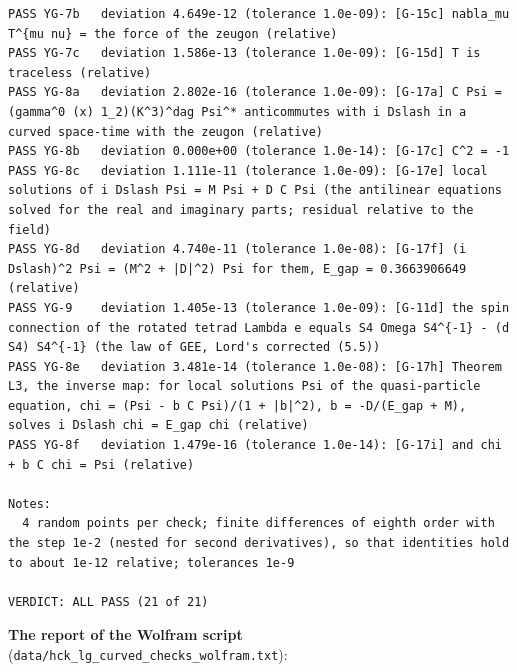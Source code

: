 \documentclass[
  10pt,
]{article}
\begin{document}
\begin{verbatim}
PASS YG-7b   deviation 4.649e-12 (tolerance 1.0e-09): [G-15c] nabla_mu T^{mu nu} = the force of the zeugon (relative)
PASS YG-7c   deviation 1.586e-13 (tolerance 1.0e-09): [G-15d] T is traceless (relative)
PASS YG-8a   deviation 2.802e-16 (tolerance 1.0e-09): [G-17a] C Psi = (gamma^0 (x) 1_2)(K^3)^dag Psi^* anticommutes with i Dslash in a curved space-time with the zeugon (relative)
PASS YG-8b   deviation 0.000e+00 (tolerance 1.0e-14): [G-17c] C^2 = -1
PASS YG-8c   deviation 1.111e-11 (tolerance 1.0e-09): [G-17e] local solutions of i Dslash Psi = M Psi + D C Psi (the antilinear equations solved for the real and imaginary parts; residual relative to the field)
PASS YG-8d   deviation 4.740e-11 (tolerance 1.0e-08): [G-17f] (i Dslash)^2 Psi = (M^2 + |D|^2) Psi for them, E_gap = 0.3663906649 (relative)
PASS YG-9    deviation 1.405e-13 (tolerance 1.0e-09): [G-11d] the spin connection of the rotated tetrad Lambda e equals S4 Omega S4^{-1} - (d S4) S4^{-1} (the law of GEE, Lord's corrected (5.5))
PASS YG-8e   deviation 3.481e-14 (tolerance 1.0e-08): [G-17h] Theorem L3, the inverse map: for local solutions Psi of the quasi-particle equation, chi = (Psi - b C Psi)/(1 + |b|^2), b = -D/(E_gap + M), solves i Dslash chi = E_gap chi (relative)
PASS YG-8f   deviation 1.479e-16 (tolerance 1.0e-14): [G-17i] and chi + b C chi = Psi (relative)

Notes:
  4 random points per check; finite differences of eighth order with the step 1e-2 (nested for second derivatives), so that identities hold to about 1e-12 relative; tolerances 1e-9

VERDICT: ALL PASS (21 of 21)
\end{verbatim}

\textbf{The report of the Wolfram script}
(\texttt{data/hck\_lg\_curved\_checks\_wolfram.txt}):
\end{document}
